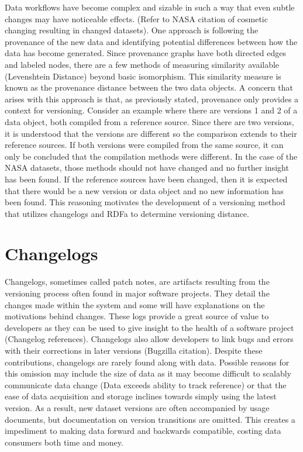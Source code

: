 Data workflows have become complex and sizable in such a way that even subtle changes may have noticeable effects.  (Refer to NASA citation of cosmetic changing resulting in changed datasets).  One approach is following the provenance of the new data and identifying potential differences between how the data has become generated.  Since provenance graphs have both directed edges and labeled nodes, there are a few methods of measuring similarity available (Levenshtein Distance) beyond basic isomorphism.  This similarity measure is known as the provenance distance between the two data objects.  A concern that arises with this approach is that, as previously stated, provenance only provides a context for versioning.  Consider an example where there are versions 1 and 2 of a data object, both compiled from a reference source.  Since there are two versions, it is understood that the versions are different so the comparison extends to their reference sources.  If both versions were compiled from the same source, it can only be concluded that the compilation methods were different.  In the case of the NASA datasets, those methods should not have changed and no further insight has been found.  If the reference sources have been changed, then it is expected that there would be a new version or data object and no new information has been found.  This reasoning motivates the development of a versioning method that utilizes changelogs and RDFa to determine versioning distance.

\section{Changelogs}

Changelogs, sometimes called patch notes, are artifacts resulting from the versioning process often found in major software projects.  They detail the changes made within the system and some will have explanations on the motivations behind changes.  These logs provide a great source of value to developers as they can be used to give insight to the health of a software project (Changelog references).  Changelogs also allow developers to link bugs and errors with their corrections in later versions (Bugzilla citation).  Despite these contributions, changelogs are rarely found along with data.  Possible reasons for this omission may include the size of data  as it may become difficult to scalably communicate data change (Data exceeds ability to track reference) or that the ease of data acquisition and storage inclines towards simply using the latest version.  As a result, new dataset versions are often accompanied by usage documents, but documentation on version transitions are omitted.  This creates a impediment to making data forward and backwards compatible, costing data consumers both time and money.



